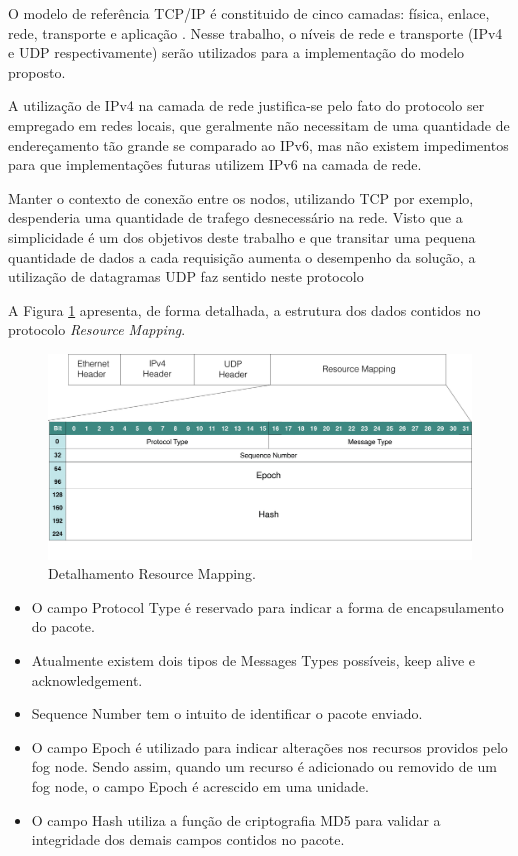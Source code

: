 O modelo de referência TCP/IP é constituido de cinco camadas: física, enlace, rede, transporte e aplicação \cite{tanenbaum2011redes}.
Nesse trabalho, o níveis de rede e transporte (IPv4 e UDP respectivamente) serão utilizados para a implementação do modelo proposto.

A utilização de IPv4 na camada de rede justifica-se pelo fato do protocolo ser empregado em redes locais, que geralmente não necessitam de uma quantidade de endereçamento tão grande 
se comparado ao IPv6, mas não existem impedimentos para que implementações futuras utilizem IPv6 na camada de rede.

Manter o contexto de conexão entre os nodos, utilizando TCP por exemplo, despenderia uma quantidade de trafego desnecessário na rede.
Visto que a simplicidade é um dos objetivos deste trabalho e que transitar uma pequena quantidade de dados a cada requisição aumenta o desempenho da solução,
a utilização de datagramas UDP faz sentido neste protocolo

A Figura \ref{fig:fig12} apresenta, de forma detalhada, a estrutura dos dados contidos no protocolo \textit{Resource Mapping}.

\begin{figure}[htb!]
    \centering\includegraphics[width=.8\textwidth]{fig12.png}
    \caption%
    {\label{fig:fig12} Detalhamento Resource Mapping.}
\end{figure}

\begin{itemize}
\item O campo Protocol Type é reservado para indicar a forma de encapsulamento do pacote.
\item Atualmente existem dois tipos de Messages Types possíveis, keep alive e acknowledgement.
\item Sequence Number tem o intuito de identificar o pacote enviado.
\item O campo Epoch é utilizado para indicar alterações nos recursos providos pelo fog node.
Sendo assim, quando um recurso é adicionado ou removido de um fog node, o campo Epoch é acrescido em uma unidade.
\item O campo Hash utiliza a função de criptografia MD5 para validar a integridade dos demais campos contidos no pacote.
\end{itemize}

